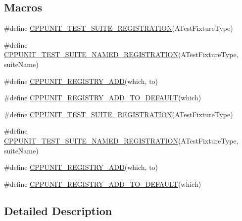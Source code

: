 \subsection*{Macros}
\begin{DoxyCompactItemize}
\item 
\#define \hyperlink{group___creating_test_suite_ga2f4071eec88d1e306665ada0f2dd80e4}{C\+P\+P\+U\+N\+I\+T\+\_\+\+T\+E\+S\+T\+\_\+\+S\+U\+I\+T\+E\+\_\+\+R\+E\+G\+I\+S\+T\+R\+A\+T\+I\+O\+N}(A\+Test\+Fixture\+Type)
\item 
\#define \hyperlink{group___creating_test_suite_ga028a5855a40ad3836e2a26aa48cd4c91}{C\+P\+P\+U\+N\+I\+T\+\_\+\+T\+E\+S\+T\+\_\+\+S\+U\+I\+T\+E\+\_\+\+N\+A\+M\+E\+D\+\_\+\+R\+E\+G\+I\+S\+T\+R\+A\+T\+I\+O\+N}(A\+Test\+Fixture\+Type, suite\+Name)
\item 
\#define \hyperlink{group___creating_test_suite_ga0785e2e8a821f70c69a8127c35c0a667}{C\+P\+P\+U\+N\+I\+T\+\_\+\+R\+E\+G\+I\+S\+T\+R\+Y\+\_\+\+A\+D\+D}(which, to)
\item 
\#define \hyperlink{group___creating_test_suite_ga9c3be3389213e1dc823ed580cc60878f}{C\+P\+P\+U\+N\+I\+T\+\_\+\+R\+E\+G\+I\+S\+T\+R\+Y\+\_\+\+A\+D\+D\+\_\+\+T\+O\+\_\+\+D\+E\+F\+A\+U\+L\+T}(which)
\item 
\#define \hyperlink{group___creating_test_suite_ga2f4071eec88d1e306665ada0f2dd80e4}{C\+P\+P\+U\+N\+I\+T\+\_\+\+T\+E\+S\+T\+\_\+\+S\+U\+I\+T\+E\+\_\+\+R\+E\+G\+I\+S\+T\+R\+A\+T\+I\+O\+N}(A\+Test\+Fixture\+Type)
\item 
\#define \hyperlink{group___creating_test_suite_ga028a5855a40ad3836e2a26aa48cd4c91}{C\+P\+P\+U\+N\+I\+T\+\_\+\+T\+E\+S\+T\+\_\+\+S\+U\+I\+T\+E\+\_\+\+N\+A\+M\+E\+D\+\_\+\+R\+E\+G\+I\+S\+T\+R\+A\+T\+I\+O\+N}(A\+Test\+Fixture\+Type, suite\+Name)
\item 
\#define \hyperlink{group___creating_test_suite_ga0785e2e8a821f70c69a8127c35c0a667}{C\+P\+P\+U\+N\+I\+T\+\_\+\+R\+E\+G\+I\+S\+T\+R\+Y\+\_\+\+A\+D\+D}(which, to)
\item 
\#define \hyperlink{group___creating_test_suite_ga9c3be3389213e1dc823ed580cc60878f}{C\+P\+P\+U\+N\+I\+T\+\_\+\+R\+E\+G\+I\+S\+T\+R\+Y\+\_\+\+A\+D\+D\+\_\+\+T\+O\+\_\+\+D\+E\+F\+A\+U\+L\+T}(which)
\end{DoxyCompactItemize}


\subsection{Detailed Description}


